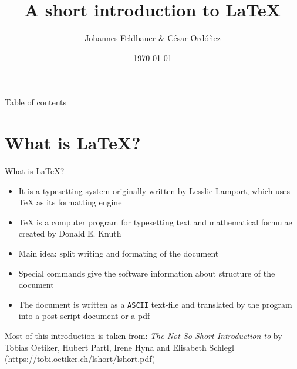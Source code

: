 \documentclass[presentation, aspectratio=1610]{beamer}
\title[Introduction to \LaTeX]{A short introduction to \LaTeX}
\author[J.Feldbauer, C. Ordóñez]{Johannes Feldbauer \& César Ordóñez}
\date{\today}
\begin{document}
	\maketitle

	\begin{frame}{Table of contents}
	\begin{minipage}[c][.75\textheight]{0.6\textwidth}
		\tableofcontents
	\end{minipage}
	\begin{minipage}{0.25\textwidth}
	\end{minipage}
	\end{frame}

	\section{What is \LaTeX ?}
	\begin{frame}{What is \LaTeX ?}
		\begin{itemize}[<+->]
			\item It is a typesetting system originally written by Lesslie Lamport, which uses \TeX{}  as its formatting engine
			\item \TeX{} is a computer program for typesetting text and mathematical formulae created by Donald E. Knuth
			\item Main idea: split writing and formating of the document
			\item Special commands give the software information about structure of the document
			\item The document is written as a \texttt{ASCII} text-file and translated by the program into a post script document or a pdf
		\end{itemize}
	\vfill
	\begin{block}{}
		{\footnotesize Most of this introduction is taken from: \textit{The Not So Short Introduction to \LaTeXe} by
			Tobias Oetiker, Hubert Partl, Irene Hyna and Elisabeth Schlegl (\url{https://tobi.oetiker.ch/lshort/lshort.pdf})}
	\end{block}
	\end{frame}
\end{document}
